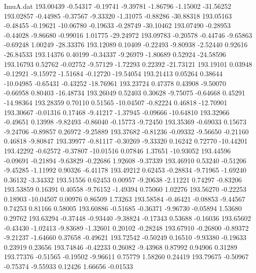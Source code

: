 \begin{filecontents}{ImuA.dat}
 193.00439   -0.54317   -0.19741   -9.39781   -1.86796   -1.15002  -31.56252
 193.02857   -0.44985   -0.37567   -9.33320   -1.31075   -0.88286  -30.88318
 193.05163   -0.48455   -0.19621  -10.06780   -0.19633   -0.28749  -30.10462
 193.07490   -0.28953   -0.44028   -9.86680   -0.99016    1.01775  -29.24972
 193.09783   -0.20578   -0.44746   -9.65863   -0.69248    1.00249  -28.33376
 193.12089    0.10409   -0.22493   -9.80938   -2.52440    0.92616  -26.84533
 193.14376    0.40199   -0.34337   -9.26979   -1.80689    0.52924  -24.58596
 193.16793    0.52762   -0.02752   -9.57129   -1.72293    0.22392  -21.73121
 193.19101    0.03948   -0.12921   -9.15972   -1.51684   -0.12720  -19.54054
 193.21413    0.05264    0.38644  -10.04985   -0.65431   -0.43252  -18.76961
 193.23724    0.47378    0.43908   -9.50070   -0.66958    0.80403  -16.48734
 193.26049    0.52403    0.30628   -9.75075   -0.64668    0.45291  -14.98364
 193.28359    0.70110    0.51565  -10.04507   -0.82224    0.46818  -12.70901
 193.30667   -0.01316    0.17468   -9.41217   -1.37945   -0.09666  -10.64810
 193.32966   -0.49651    0.13998   -9.82493   -0.86040   -0.15773   -9.72450
 193.35369   -0.69033    0.15673   -9.24706   -0.89857    0.26972   -9.25889
 193.37682   -0.81236   -0.09332   -9.56650   -0.21160    0.46818   -9.80847
 193.39977   -0.81117   -0.30269   -9.33320    0.16242    0.72770  -10.44201
 193.42292   -0.62572   -0.37807  -10.01516    0.07846    1.37651  -10.93052
 193.44596   -0.09691   -0.21894   -9.63829   -0.22686    1.92608   -9.37339
 193.46910    0.53240   -0.51206   -9.45285   -1.11992    0.90326   -6.41178
 193.49212    0.62453   -0.28834   -9.71965   -1.69240    0.36132   -3.34332
 193.51556    0.62453    0.00957   -9.20638   -2.11221    0.74297   -0.83206
 193.53859    0.16391    0.40558   -9.76152   -1.49394    0.75060    1.02276
 193.56270   -0.22253    0.18903  -10.04507    0.00976    0.86509    1.73263
 193.58584   -0.46421   -0.08853   -9.44567    0.74253    0.81166    0.58005
 193.60886   -0.51685   -0.36371   -9.96730   -0.05894    1.53680    0.29762
 193.63294   -0.37448   -0.93440   -9.38824   -0.17343    0.53688   -0.16036
 193.65602   -0.43430   -1.02413   -9.83689   -1.32601    0.20102   -0.28248
 193.67910   -0.26800   -0.89372   -9.21237   -1.64660    0.37658   -0.49621
 193.72542   -0.50249    0.16510   -9.93380   -0.19633    0.23919    0.23656
 193.74846   -0.42233    0.26082   -9.43968    0.87992    0.94906    0.31289
 193.77376   -0.51565   -0.19502   -9.96611    0.75779    1.58260    0.24419
 193.79675   -0.50967   -0.75374   -9.55933    0.12426    1.66656   -0.01533

\end{filecontents}
